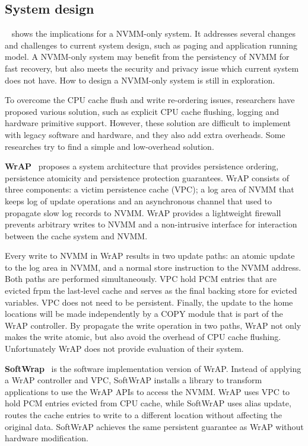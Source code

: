 \subsection{System design} 
\label{sec:systemdesign}

~\cite{systemimplications} shows the implications for a NVMM-only
system. It addresses several changes and challenges to current system design,
such as paging and application running model. A NVMM-only system may benefit
from the persistency of NVMM for fast recovery, but also meets the security
and privacy issue which current system does not have. How to design a
NVMM-only system is still in exploration.

To overcome the CPU cache flush and write re-ordering issues, researchers
have proposed various solution, such as explicit CPU cache flushing, logging
and hardware primitive support. However, these solution are difficult
to implement with legacy software and hardware, and they also add extra
overheads. Some researches try to find a simple and low-overhead solution.

\textbf{WrAP}~\cite{WrAP} proposes a system architecture
 that provides persistence
ordering, persistence atomicity and persistence protection guarantees. 
WrAP consists of three components: a victim persistence cache (VPC); a log
area of NVMM that keeps log of update operations and an asynchronous channel
that used to propagate slow log records to NVMM. WrAP provides a lightweight
firewall prevents arbitrary writes to NVMM and a non-intrusive interface
for interaction between the cache system and NVMM.

Every write to NVMM in WrAP results in two update paths: an atomic update to
the log area in NVMM, and a normal store instruction to the NVMM address. Both
paths are performed simultaneously. VPC hold PCM entries that are evicted
frpm the last-level cache and serves as the final backing store for evicted
variables. VPC does not need to be persistent.
Finally, the update to the home locations will be made
independently by a COPY module that is part of the WrAP controller. 
By propagate the write operation in two paths, WrAP not only makes the 
write atomic, but also avoid the overhead of CPU cache flushing.
Unfortunately WrAP does not provide evaluation of their system.

\textbf{SoftWrap}~\cite{softWrAP}
 is the software implementation version of WrAP.
Instead of applying a WrAP controller and VPC, SoftWrAP installs a library
to transform applications to use the WrAP APIs to access the NVMM. WrAP
uses VPC to hold PCM entries evicted from CPU cache, while SoftWrAP
uses alias update, routes the cache entries to write to a different location
without affecting the original data. SoftWrAP achieves the same persistent
guarantee as WrAP without hardware modification.

